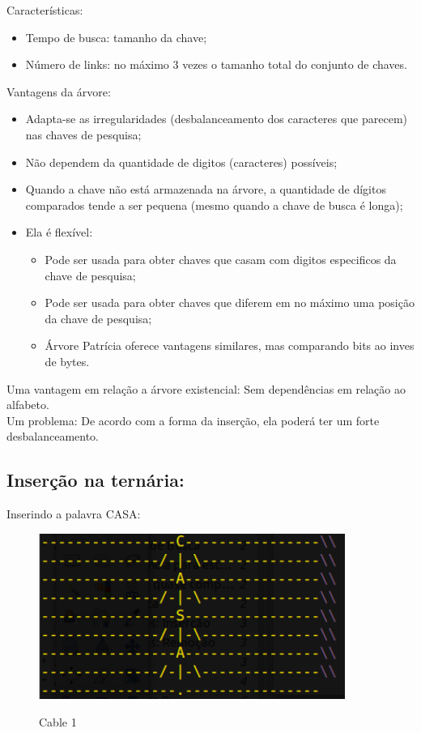 \documentclass{article}
\begin{document}
Características:

\begin{itemize}
   \item Tempo de busca: tamanho da chave;
   \item Número de links: no máximo 3 vezes o tamanho total do conjunto de chaves.
\end{itemize}

Vantagens da árvore:

\begin{itemize}
   \item Adapta-se as irregularidades (desbalanceamento dos caracteres que parecem) nas chaves de
pesquisa;
   \item Não dependem da quantidade de digitos (caracteres) possíveis;
   \item Quando a chave não está armazenada na árvore, a quantidade de dígitos comparados tende a ser pequena (mesmo quando a chave de busca
é longa);
   \item Ela é flexível:
      \begin{itemize}
         \item Pode ser usada para obter chaves que casam com digitos especificos da chave
de pesquisa;
         \item Pode ser usada para obter chaves que diferem em no máximo uma posição da chave de
pesquisa;
         \item Árvore Patrícia oferece vantagens similares, mas comparando bits ao inves de bytes.
      \end{itemize}
\end{itemize}

Uma vantagem em relação a árvore existencial: Sem dependências em relação ao alfabeto.\\
Um problema: De acordo com a forma da inserção, ela poderá ter um forte desbalanceamento.

\newpage

\subsection{Inserção na ternária:}

Inserindo a palavra CASA:\\
\begin{figure}[h]
    \center
    \includegraphics[width=10cm]{imagens/ternaria1.png}
    \label{cable}
    \caption{Cable 1}
\end{figure}
\end{document}
